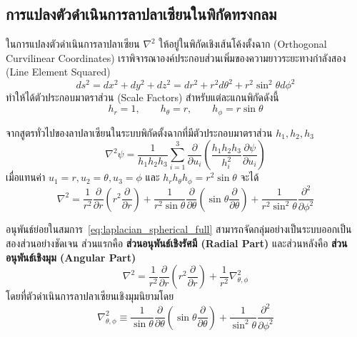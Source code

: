 \subsection{การแปลงตัวดำเนินการลาปลาเซียนในพิกัดทรงกลม}
ในการแปลงตัวดำเนินการลาปลาเซียน $\nabla^2$ ให้อยู่ในพิกัดเชิงเส้นโค้งตั้งฉาก (Orthogonal Curvilinear Coordinates) เราพิจารณาองค์ประกอบส่วนเพิ่มของความยาวระยะทางกำลังสอง (Line Element Squared)
\begin{equation}
ds^2 = dx^2 + dy^2 + dz^2 = dr^2 + r^2 d\theta^2 + r^2 \sin^2\theta d\phi^2
\end{equation}
ทำให้ได้ตัวประกอบมาตราส่วน (Scale Factors) สำหรับแต่ละแกนพิกัดดังนี้
\begin{equation}
h_r = 1, \qquad h_\theta = r, \qquad h_\phi = r\sin\theta
\end{equation}

จากสูตรทั่วไปของลาปลาเซียนในระบบพิกัดตั้งฉากที่มีตัวประกอบมาตราส่วน $h_1, h_2, h_3$
\begin{equation}
\nabla^2 \psi = \frac{1}{h_1 h_2 h_3} \sum_{i=1}^3 \frac{\partial}{\partial u_i} \left( \frac{h_1 h_2 h_3}{h_i^2} \frac{\partial \psi}{\partial u_i} \right)
\end{equation}
เมื่อแทนค่า $u_1 = r, u_2 = \theta, u_3 = \phi$ และ $h_r h_\theta h_\phi = r^2 \sin\theta$ จะได้
\begin{equation}
\nabla^2 = \frac{1}{r^2} \frac{\partial}{\partial r}\left( r^2 \frac{\partial}{\partial r} \right) + \frac{1}{r^2 \sin\theta} \frac{\partial}{\partial \theta}\left( \sin\theta \frac{\partial}{\partial \theta} \right) + \frac{1}{r^2 \sin^2\theta} \frac{\partial^2}{\partial \phi^2}
\label{eq:laplacian_spherical_full}
\end{equation}

อนุพันธ์ย่อยในสมการ~\eqref{eq:laplacian_spherical_full} สามารถจัดกลุ่มอย่างเป็นระบบออกเป็นสองส่วนอย่างชัดเจน ส่วนแรกคือ \textbf{ส่วนอนุพันธ์เชิงรัศมี (Radial Part)} และส่วนหลังคือ \textbf{ส่วนอนุพันธ์เชิงมุม (Angular Part)}
\begin{equation}
\nabla^2 = \frac{1}{r^2} \frac{\partial}{\partial r}\left( r^2 \frac{\partial}{\partial r} \right) + \frac{1}{r^2} \nabla_{\theta, \phi}^2
\end{equation}
โดยที่ตัวดำเนินการลาปลาเซียนเชิงมุมนิยามโดย
\begin{equation}
\nabla_{\theta, \phi}^2 \equiv \frac{1}{\sin\theta} \frac{\partial}{\partial \theta}\left( \sin\theta \frac{\partial}{\partial \theta} \right) + \frac{1}{\sin^2\theta} \frac{\partial^2}{\partial \phi^2}
\label{eq:angular_laplacian}
\end{equation}

